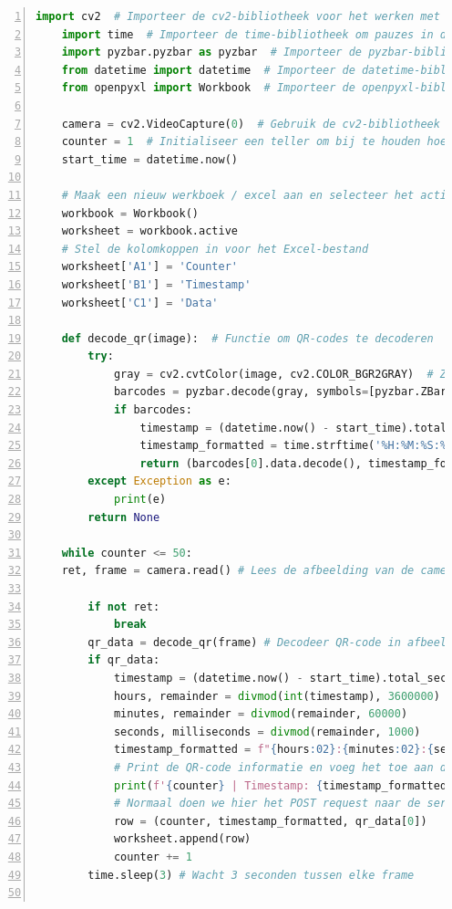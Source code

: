 \begin{lstlisting}[language=Python, caption={Python script voor experiment van QR-code camera \autocite{LockitRentals}.}, label=lst:huidigeQR-codeData, numbers=left]
    import cv2  # Importeer de cv2-bibliotheek voor het werken met beeldverwerking
    import time  # Importeer de time-bibliotheek om pauzes in de uitvoering van het programma te creëren
    import pyzbar.pyzbar as pyzbar  # Importeer de pyzbar-bibliotheek voor het decoderen van QR-codes
    from datetime import datetime  # Importeer de datetime-bibliotheek om tijdstempels te maken
    from openpyxl import Workbook  # Importeer de openpyxl-bibliotheek voor het werken met Excel-bestanden
    
    camera = cv2.VideoCapture(0)  # Gebruik de cv2-bibliotheek om toegang te krijgen tot de camera
    counter = 1  # Initialiseer een teller om bij te houden hoeveel QR-codes zijn gescand
    start_time = datetime.now()
    
    # Maak een nieuw werkboek / excel aan en selecteer het actieve werkblad
    workbook = Workbook()
    worksheet = workbook.active
    # Stel de kolomkoppen in voor het Excel-bestand
    worksheet['A1'] = 'Counter'
    worksheet['B1'] = 'Timestamp'
    worksheet['C1'] = 'Data'
    
    def decode_qr(image):  # Functie om QR-codes te decoderen
        try:
            gray = cv2.cvtColor(image, cv2.COLOR_BGR2GRAY)  # Zet het kleurenbeeld om in grijswaarden
            barcodes = pyzbar.decode(gray, symbols=[pyzbar.ZBarSymbol.QRCODE])  # Decodeer QR-codes
            if barcodes:
                timestamp = (datetime.now() - start_time).total_seconds()  # Bereken het tijdsverschil vanaf het begin
                timestamp_formatted = time.strftime('%H:%M:%S:%f', time.gmtime(timestamp))  # Maak de tijdstempel
                return (barcodes[0].data.decode(), timestamp_formatted)  # Return de gedecodeerde gegevens en tijdstempel
        except Exception as e:
            print(e)
        return None
    
    while counter <= 50:
    ret, frame = camera.read() # Lees de afbeelding van de camera
    
        if not ret:
            break
        qr_data = decode_qr(frame) # Decodeer QR-code in afbeelding
        if qr_data:
            timestamp = (datetime.now() - start_time).total_seconds() * 1000 # Formatteer de timestamp
            hours, remainder = divmod(int(timestamp), 3600000)
            minutes, remainder = divmod(remainder, 60000)
            seconds, milliseconds = divmod(remainder, 1000)
            timestamp_formatted = f"{hours:02}:{minutes:02}:{seconds:02}:{milliseconds:03}"
            # Print de QR-code informatie en voeg het toe aan de Excel-sheet
            print(f'{counter} | Timestamp: {timestamp_formatted} | Data: {qr_data[0]}')
            # Normaal doen we hier het POST request naar de server zie originele code
            row = (counter, timestamp_formatted, qr_data[0])
            worksheet.append(row)
            counter += 1
        time.sleep(3) # Wacht 3 seconden tussen elke frame
    

\end{lstlisting}
